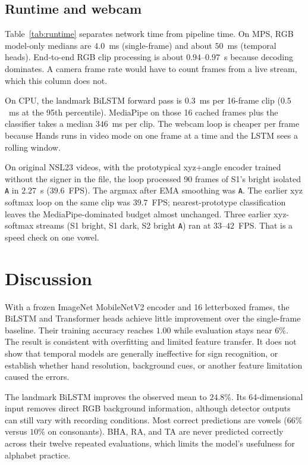 \documentclass[11pt,a4paper]{article}
\begin{document}
\subsection{Runtime and webcam}

Table~\ref{tab:runtime} separates network time from pipeline time. On MPS, RGB model-only medians are $4.0$~ms (single-frame) and about $50$~ms (temporal heads). End-to-end RGB clip processing is about $0.94$--$0.97$~s because decoding dominates. A camera frame rate would have to count frames from a live stream, which this column does not.

On CPU, the landmark BiLSTM forward pass is $0.3$~ms per 16-frame clip ($0.5$~ms at the 95th percentile). MediaPipe on those 16 cached frames plus the classifier takes a median $346$~ms per clip. The webcam loop is cheaper per frame because Hands runs in video mode on one frame at a time and the LSTM sees a rolling window.

On original NSL23 videos, with the prototypical xyz+angle encoder trained without the signer in the file, the loop processed 90 frames of S1's bright isolated \texttt{A} in $2.27$~s ($39.6$~FPS). The argmax after EMA smoothing was \texttt{A}. The earlier xyz softmax loop on the same clip was $39.7$~FPS; nearest-prototype classification leaves the MediaPipe-dominated budget almost unchanged. Three earlier xyz-softmax streams (S1 bright, S1 dark, S2 bright \texttt{A}) ran at $33$--$42$~FPS. That is a speed check on one vowel.

\section{Discussion}

With a frozen ImageNet MobileNetV2 encoder and 16 letterboxed frames, the BiLSTM and Transformer heads achieve little improvement over the single-frame baseline. Their training accuracy reaches $1.00$ while evaluation stays near $6\%$. The result is consistent with overfitting and limited feature transfer. It does not show that temporal models are generally ineffective for sign recognition, or establish whether hand resolution, background cues, or another feature limitation caused the errors.

The landmark BiLSTM improves the observed mean to $24.8\%$. Its 64-dimensional input removes direct RGB background information, although detector outputs can still vary with recording conditions. Most correct predictions are vowels ($66\%$ versus $10\%$ on consonants). BHA, RA, and TA are never predicted correctly across their twelve repeated evaluations, which limits the model's usefulness for alphabet practice.
\end{document}
